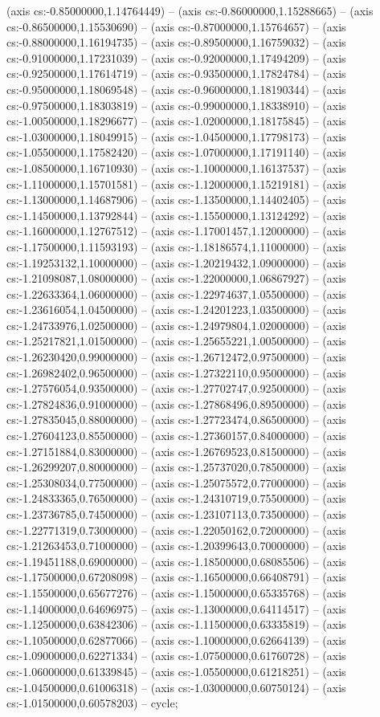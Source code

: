 (axis cs:-0.85000000,1.14764449) -- (axis cs:-0.86000000,1.15288665) -- (axis cs:-0.86500000,1.15530690) -- (axis cs:-0.87000000,1.15764657) -- (axis cs:-0.88000000,1.16194735) -- (axis cs:-0.89500000,1.16759032) -- (axis cs:-0.91000000,1.17231039) -- (axis cs:-0.92000000,1.17494209) -- (axis cs:-0.92500000,1.17614719) -- (axis cs:-0.93500000,1.17824784) -- (axis cs:-0.95000000,1.18069548) -- (axis cs:-0.96000000,1.18190344) -- (axis cs:-0.97500000,1.18303819) -- (axis cs:-0.99000000,1.18338910) -- (axis cs:-1.00500000,1.18296677) -- (axis cs:-1.02000000,1.18175845) -- (axis cs:-1.03000000,1.18049915) -- (axis cs:-1.04500000,1.17798173) -- (axis cs:-1.05500000,1.17582420) -- (axis cs:-1.07000000,1.17191140) -- (axis cs:-1.08500000,1.16710930) -- (axis cs:-1.10000000,1.16137537) -- (axis cs:-1.11000000,1.15701581) -- (axis cs:-1.12000000,1.15219181) -- (axis cs:-1.13000000,1.14687906) -- (axis cs:-1.13500000,1.14402405) -- (axis cs:-1.14500000,1.13792844) -- (axis cs:-1.15500000,1.13124292) -- (axis cs:-1.16000000,1.12767512) -- (axis cs:-1.17001457,1.12000000) -- (axis cs:-1.17500000,1.11593193) -- (axis cs:-1.18186574,1.11000000) -- (axis cs:-1.19253132,1.10000000) -- (axis cs:-1.20219432,1.09000000) -- (axis cs:-1.21098087,1.08000000) -- (axis cs:-1.22000000,1.06867927) -- (axis cs:-1.22633364,1.06000000) -- (axis cs:-1.22974637,1.05500000) -- (axis cs:-1.23616054,1.04500000) -- (axis cs:-1.24201223,1.03500000) -- (axis cs:-1.24733976,1.02500000) -- (axis cs:-1.24979804,1.02000000) -- (axis cs:-1.25217821,1.01500000) -- (axis cs:-1.25655221,1.00500000) -- (axis cs:-1.26230420,0.99000000) -- (axis cs:-1.26712472,0.97500000) -- (axis cs:-1.26982402,0.96500000) -- (axis cs:-1.27322110,0.95000000) -- (axis cs:-1.27576054,0.93500000) -- (axis cs:-1.27702747,0.92500000) -- (axis cs:-1.27824836,0.91000000) -- (axis cs:-1.27868496,0.89500000) -- (axis cs:-1.27835045,0.88000000) -- (axis cs:-1.27723474,0.86500000) -- (axis cs:-1.27604123,0.85500000) -- (axis cs:-1.27360157,0.84000000) -- (axis cs:-1.27151884,0.83000000) -- (axis cs:-1.26769523,0.81500000) -- (axis cs:-1.26299207,0.80000000) -- (axis cs:-1.25737020,0.78500000) -- (axis cs:-1.25308034,0.77500000) -- (axis cs:-1.25075572,0.77000000) -- (axis cs:-1.24833365,0.76500000) -- (axis cs:-1.24310719,0.75500000) -- (axis cs:-1.23736785,0.74500000) -- (axis cs:-1.23107113,0.73500000) -- (axis cs:-1.22771319,0.73000000) -- (axis cs:-1.22050162,0.72000000) -- (axis cs:-1.21263453,0.71000000) -- (axis cs:-1.20399643,0.70000000) -- (axis cs:-1.19451188,0.69000000) -- (axis cs:-1.18500000,0.68085506) -- (axis cs:-1.17500000,0.67208098) -- (axis cs:-1.16500000,0.66408791) -- (axis cs:-1.15500000,0.65677276) -- (axis cs:-1.15000000,0.65335768) -- (axis cs:-1.14000000,0.64696975) -- (axis cs:-1.13000000,0.64114517) -- (axis cs:-1.12500000,0.63842306) -- (axis cs:-1.11500000,0.63335819) -- (axis cs:-1.10500000,0.62877066) -- (axis cs:-1.10000000,0.62664139) -- (axis cs:-1.09000000,0.62271334) -- (axis cs:-1.07500000,0.61760728) -- (axis cs:-1.06000000,0.61339845) -- (axis cs:-1.05500000,0.61218251) -- (axis cs:-1.04500000,0.61006318) -- (axis cs:-1.03000000,0.60750124) -- (axis cs:-1.01500000,0.60578203) -- cycle;
